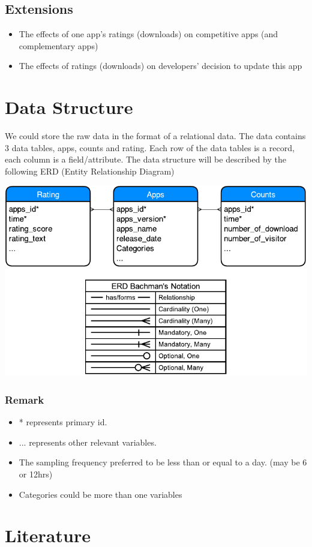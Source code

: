\documentclass[11pt,twoside]{article}
\begin{document}
\subsection{Extensions}
\begin{itemize}
\item The effects of one app's ratings (downloads) on competitive apps (and complementary apps)

\item The effects of ratings (downloads) on developers' decision to update this app
\end{itemize}

\section{Data Structure}
We could store the raw data in the format of a relational data. The data contains 3 data tables, apps, counts and rating. Each row of the data tables is a record, each column is a field/attribute. The data structure will be described by the following ERD (Entity Relationship Diagram) 

\begin{center}
\includegraphics{erd1.pdf}
\end{center}

\subsubsection*{Remark}
\begin{itemize}
	\item * represents primary id. 
	\item ... represents other relevant variables.
	\item The sampling frequency preferred to be less than or equal to a day. (may be 6 or 12hrs)
	\item Categories could be more than one variables
\end{itemize}


\section{Literature}
\newpage




\newpage

\appendix
\renewcommand{\thesection}{Appendix \Roman{section}}
\renewcommand{\thesubsection}{Appendix \Roman{section}(\roman{subsection})}
\end{document}
